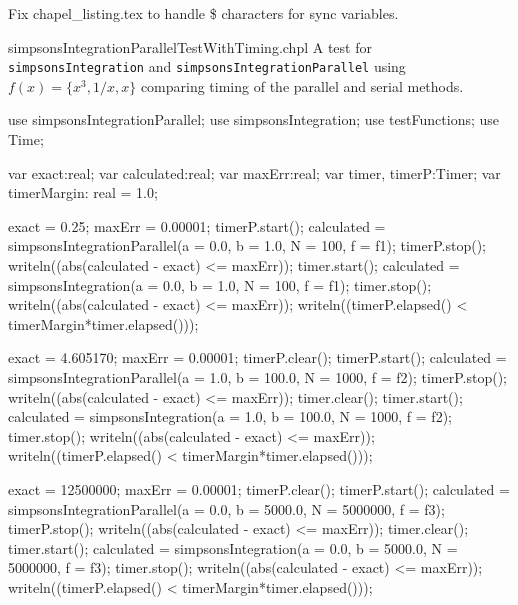 \begin{TODO}
  Fix chapel\_listing.tex to handle \$ characters for sync variables.
\end{TODO}

\begin{chapelexample}{simpsonsIntegrationParallelTestWithTiming.chpl}
  A test for \lstinline{simpsonsIntegration} and \lstinline{simpsonsIntegrationParallel} 
  using $f(x) = \{x^3, 1/x, x\}$ comparing timing of the parallel and serial methods.
  \begin{chapelpre}
  \end{chapelpre}
  \begin{chapel}
    use simpsonsIntegrationParallel;
    use simpsonsIntegration;
    use testFunctions;
    use Time;

    var exact:real;
    var calculated:real;
    var maxErr:real;
    var timer, timerP:Timer;
    var timerMargin: real = 1.0;

    exact = 0.25;
    maxErr = 0.00001;
    timerP.start();
    calculated = simpsonsIntegrationParallel(a = 0.0, b = 1.0, N = 100, f = f1);
    timerP.stop();
    writeln((abs(calculated - exact) <= maxErr));
    timer.start();
    calculated = simpsonsIntegration(a = 0.0, b = 1.0, N = 100, f = f1);
    timer.stop();
    writeln((abs(calculated - exact) <= maxErr));
    writeln((timerP.elapsed() < timerMargin*timer.elapsed()));

    exact = 4.605170;
    maxErr = 0.00001;
    timerP.clear();
    timerP.start();
    calculated = simpsonsIntegrationParallel(a = 1.0, b = 100.0, N = 1000, f = f2);
    timerP.stop();
    writeln((abs(calculated - exact) <= maxErr));
    timer.clear();
    timer.start();
    calculated = simpsonsIntegration(a = 1.0, b = 100.0, N = 1000, f = f2);
    timer.stop();
    writeln((abs(calculated - exact) <= maxErr));
    writeln((timerP.elapsed() < timerMargin*timer.elapsed()));

    exact = 12500000;
    maxErr = 0.00001;
    timerP.clear();
    timerP.start();
    calculated = simpsonsIntegrationParallel(a = 0.0, b = 5000.0, N = 5000000, f = f3);
    timerP.stop();
    writeln((abs(calculated - exact) <= maxErr));
    timer.clear();
    timer.start();
    calculated = simpsonsIntegration(a = 0.0, b = 5000.0, N = 5000000, f = f3);
    timer.stop();
    writeln((abs(calculated - exact) <= maxErr));
    writeln((timerP.elapsed() < timerMargin*timer.elapsed()));


\end{chapel}
\end{chapelexample}
